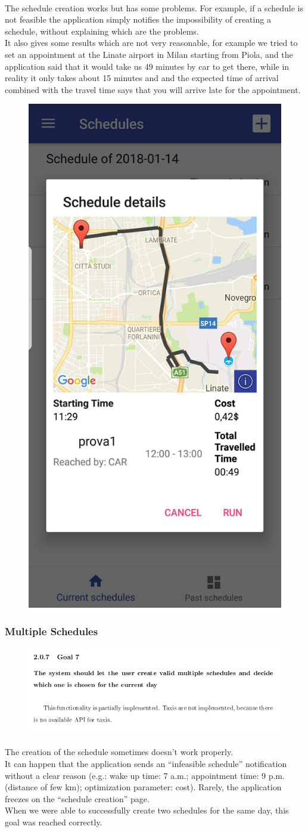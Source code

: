 \documentclass{article}
\begin{document}
			\paragraph{}The schedule creation works but has some problems. For example, if a schedule is not feasible the application simply notifies the impossibility of creating a schedule, without explaining which are the problems.\\It also gives some results which are not very reasonable, for example we tried to set an appointment at the Linate airport in Milan starting from Piola, and the application said that it would take us 49 minutes by car to get there, while in reality it only takes about 15 minutes and and the expected time of arrival combined with the travel time says that you will arrive late for the appointment.
			\begin{figure}[H]
			\begin{center}
			\includegraphics[width=0.2\linewidth]{Images/Goals/Car_route.jpg}
			\label{fig:CR}
			\end{center}
			\end{figure}			
			\subsubsection{Multiple Schedules}
			\begin{figure}[H]
			\includegraphics[width=\linewidth]{Images/Goals/Goal_7.png}
			\label{fig:G7}
			\end{figure}
			\paragraph{}The creation of the schedule sometimes doesn’t work properly. \\It can happen that the application sends an “infeasible schedule” notification without a clear reason (e.g.: wake up time: 7 a.m.; appointment time: 9 p.m. (distance of few km); optimization parameter: cost). Rarely, the application freezes on the “schedule creation” page. \\
When we were able to successfully create two schedules for the same day, this goal was reached correctly. 
\end{document}
